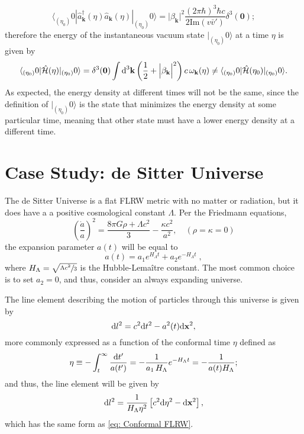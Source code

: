 \begin{equation}
	\langle_{(\eta_0)}0|\hat{a}^\dagger_\mathbf{k}(\eta)\hat{a}_\mathbf{k}(\eta)|_{(\eta_0)}0\rangle=\Big|\beta_\mathbf{k}\Big|^2\frac{(2\pi\hbar)^3\hbar c}{2\text{Im}(v\bar v')}\delta^3(\mathbf{0});
\end{equation}
therefore the energy of the instantaneous vacuum state $|_{(\eta_0)}0\rangle$ at a time $\eta$ is given by
\begin{equation}
	\langle_{(\eta_0)}0|\hat{\mathcal{H}}(\eta)|_{(\eta_0)}0\rangle=\delta^3(\mathbf{0})\int\text{d}^3\mathbf{k}\left(\frac{1}{2}+\Big|\beta_\mathbf{k}\Big|^2\right)c\,\omega_\mathbf{k}(\eta)\not= \langle_{(\eta_0)}0|\hat{\mathcal{H}}(\eta_0)|_{(\eta_0)}0\rangle.
\end{equation}
As expected, the energy density at different times will not be the same, since the definition of $|_{(\eta_0)}0\rangle$ is the state that minimizes the energy density at some particular time, meaning that other state must have a lower energy density at a different time.
\section{Case Study: de Sitter Universe}
The de Sitter Universe is a flat FLRW metric with no matter or radiation, but it does have a a positive cosmological constant $\Lambda$. Per the Friedmann equations,
\begin{equation}
	\left(\frac{\dot{a}}{a}\right)^2=\frac{8\pi G\rho+\Lambda c^2}{3}-\frac{\kappa c^2}{a^2},\quad \left(\rho=\kappa=0\right)
\end{equation}
the expansion parameter $a(t)$ will be equal to
\begin{equation}
	a(t)=a_1e^{H_\Lambda t}+a_2e^{-H_\Lambda t}\;,
\end{equation}
where $H_\Lambda=\sqrt{\sfrac{\Lambda c^2}{3}}$ is the Hubble-Lemaître constant. The most common choice is to set $a_2=0$, and thus, consider an always expanding universe.

The line element describing the motion of particles through this universe is given by
\begin{equation}
	\text{d} l^2=c^2\text{d} t^2-a^2(t)\text{d}\mathbf{x}^2,
\end{equation}
more commonly expressed as a function of the conformal time $\eta$ defined as
\begin{equation}
	\eta\equiv -\int_t^\infty\frac{\text{d} t'}{a(t')}=-\frac{1}{a_1\,H_\Lambda}e^{-H_\Lambda t}=-\frac{1}{a(t)H_\Lambda};
\end{equation}
and thus, the line element will be given by
\begin{equation}
	\text{d} l^2= \frac{1}{H_\Lambda\eta^2}\left[c^2\text{d}\eta^2-\text{d} \mathbf{x}^2\right],
\end{equation}
which has the same form as \ref{eq: Conformal FLRW}. 

